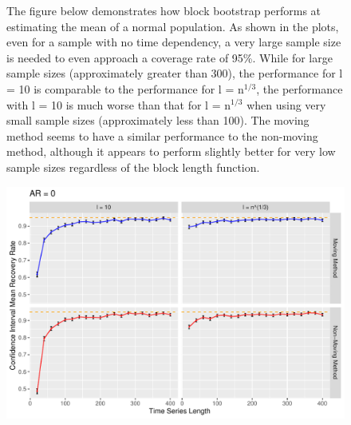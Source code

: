 \documentclass[12pt, letterpaper, titlepage]{article}
\begin{document}
\begin{figure}[tbp]
\caption{The figure below demonstrates how block bootstrap performs at estimating the mean of a normal population. As shown in the plots, even for a sample with no time dependency, a very large sample size is needed to even approach a coverage rate of 95\%.  While for large sample sizes (approximately greater than 300), the performance for l = 10 is comparable to the performance for l = n$^{1/3}$, the performance with l = 10 is much worse than that for l = n$^{1/3}$ when using very small sample sizes (approximately less than 100). The moving method seems to have a similar performance to the non-moving method, although it appears to perform slightly better for very low sample sizes regardless of the block length function.}
  \centering
  \includegraphics[width=\textwidth]{norm}
  \caption{}
  \label{fig:norm}
\end{figure}
\end{document}
